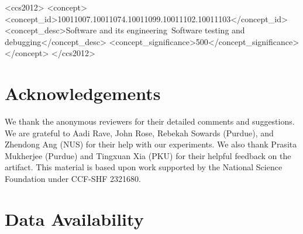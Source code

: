 \documentclass[acmsmall]{acmart}
\begin{document}
\begin{CCSXML}
  <ccs2012>
     <concept>
         <concept_id>10011007.10011074.10011099.10011102.10011103</concept_id>
         <concept_desc>Software and its engineering~Software testing and debugging</concept_desc>
         <concept_significance>500</concept_significance>
         </concept>
   </ccs2012>
\end{CCSXML}



\maketitle

% 
% 
% 
% 

% 
% 








\section*{Acknowledgements}

We thank the anonymous reviewers for their detailed comments and
suggestions.  We are grateful to Aadi Rave, John Rose, Rebekah Sowards
(Purdue), and Zhendong Ang (NUS) for their help with our experiments.
We also thank Prasita Mukherjee (Purdue) and Tingxuan Xia (PKU) for
their helpful feedback on the artifact.  This material is based upon
work supported by the National Science Foundation under CCF-SHF
2321680.

\section*{Data Availability}
\label{sec:data}
\end{document}
